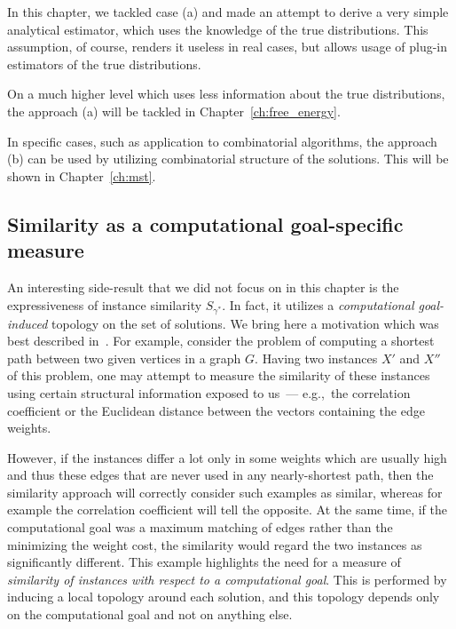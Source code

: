 In this chapter, we tackled case (a) and made an attempt to derive a very simple
analytical estimator, which uses the knowledge of the true distributions. This
assumption, of course, renders it useless in real cases, but allows usage of
plug-in estimators of the true distributions.

On a much higher level which uses less information about the true distributions,
the approach (a) will be tackled in Chapter~\ref{ch:free_energy}.

In specific cases, such as application to combinatorial algorithms, the approach
(b) can be used by utilizing combinatorial structure of the solutions. This will
be shown in Chapter~\ref{ch:mst}.

\subsection*{Similarity as a computational goal-specific measure}
An interesting side-result that we did not focus on in this chapter is the
expressiveness of instance similarity $S_{\gamma^*}$. In fact, it utilizes a
\textit{computational goal-induced} topology on the set of solutions. We bring
here a motivation which was best described in~\citep{jcss:2017}.
For example, consider the problem of computing a shortest path between two given
vertices in a graph $G$. 
%
Having two instances $X'$ and $X''$ of this problem, one may attempt to measure
the similarity of these instances using certain structural information exposed to
us~--- e.g.,~the correlation coefficient or the Euclidean distance between the
vectors containing the edge weights.

However, if the instances differ a lot only in some weights which are usually
high and thus these edges that are never used in any nearly-shortest path, then
the similarity approach will correctly consider such examples as similar,
whereas for example the correlation coefficient will tell the opposite.
%
At the same time, if the computational goal was a maximum matching of edges
rather than the minimizing the weight cost, the similarity would regard the two
instances as significantly different.
%
This example highlights the need for a measure of \emph{similarity of instances
with respect to a computational goal}. This is performed by inducing a local topology
around each solution, and this topology depends only on the computational goal
and not on anything else.

